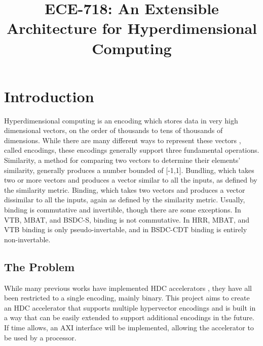 \documentclass[conference]{IEEEtran}
\begin{document}
\title{ECE-718: An Extensible Architecture for Hyperdimensional Computing}

\author{
}

\maketitle



\section{Introduction}

Hyperdimensional computing is an encoding which stores data in very high dimensional vectors, on the order of thousands to tens of thousands of dimensions. While there are many different ways to represent these vectors \cite{hdccompare}, called encodings, these encodings generally support three fundamental operations. Similarity, a method for comparing two vectors to determine their elements' similarity, generally produces a number bounded of [-1,1]. Bundling, which takes two or more vectors and produces a vector similar to all the inputs, as defined by the similarity metric. Binding, which takes two vectors and produces a vector dissimilar to all the inputs, again as defined by the similarity metric. Usually, binding is commutative and invertible, though there are some exceptions. In VTB\cite{vtb}, MBAT\cite{mbat}, and BSDC-S\cite{bsdc}, binding is not commutative. In HRR\cite{hrr}, MBAT\cite{mbat}, and VTB\cite{vtb} binding is only pseudo-invertable, and in BSDC-CDT\cite{bsdc} binding is entirely non-invertable.

\subsection{The Problem}

While many previous works have implemented HDC accelerators \cite{rischd, sparsehd, bric}, they have all been restricted to a single encoding, mainly binary. This project aims to create an HDC accelerator that supports multiple hypervector encodings and is built in a way that can be easily extended to support additional encodings in the future. If time allows, an AXI interface will be implemented, allowing the accelerator to be used by a processor.
\end{document}
